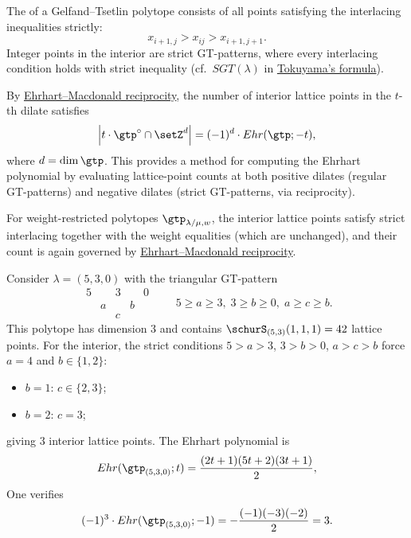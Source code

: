 The  of a Gelfand--Tsetlin polytope consists of
all points satisfying the interlacing inequalities strictly:
\[
x_{i+1,j} > x_{ij} > x_{i+1,j+1}.
\]
Integer points in the interior are strict GT-patterns,
where every interlacing condition holds with strict inequality
(cf.\ $SGT(\lambda)$ in \hyperref[gtpatternsTokuyama]{Tokuyama's formula}).

By \hyperref[ehrhartMacdonaldReciprocity]{Ehrhart--Macdonald reciprocity},
the number of interior lattice points in the $t$-th dilate satisfies
\[
\left| t \cdot \gtp^{\circ} \cap \setZ^d \right| = (-1)^d \cdot Ehr(\gtp; -t),
\]
where $d = \dim \gtp$.
This provides a method for computing the Ehrhart polynomial by
evaluating lattice-point counts at both positive dilates (regular GT-patterns)
and negative dilates (strict GT-patterns, via reciprocity).

For weight-restricted polytopes $\gtp_{\lambda/\mu,w}$,
the interior lattice points satisfy strict interlacing
together with the weight equalities (which are unchanged),
and their count is again governed by
\hyperref[ehrhartMacdonaldReciprocity]{Ehrhart--Macdonald reciprocity}.


\begin{example*}[Reciprocity]
Consider $\lambda = (5,3,0)$ with the triangular GT-pattern
\[
\begin{matrix}
5 && 3 && 0 \\
& a && b \\
&& c
\end{matrix}
\qquad
5 \geq a \geq 3,\; 3 \geq b \geq 0,\; a \geq c \geq b.
\]
This polytope has dimension $3$ and contains
$\schurS_{(5,3)}(1,1,1) = 42$ lattice points.
For the interior, the strict conditions
$5 > a > 3$, $3 > b > 0$, $a > c > b$
force $a = 4$ and $b \in \{1, 2\}$:
\begin{itemize}
\item $b=1$: $c \in \{2, 3\}$;
\item $b=2$: $c = 3$;
\end{itemize}
giving $3$ interior lattice points.
The Ehrhart polynomial is
\[
Ehr(\gtp_{(5,3,0)};t) = \frac{(2t+1)(5t+2)(3t+1)}{2},
\]
One verifies
\[
  (-1)^3 \cdot Ehr(\gtp_{(5,3,0)};-1)
  =
  -\frac{(-1)(-3)(-2)}{2}
  =
  3.
\]
\end{example*}


